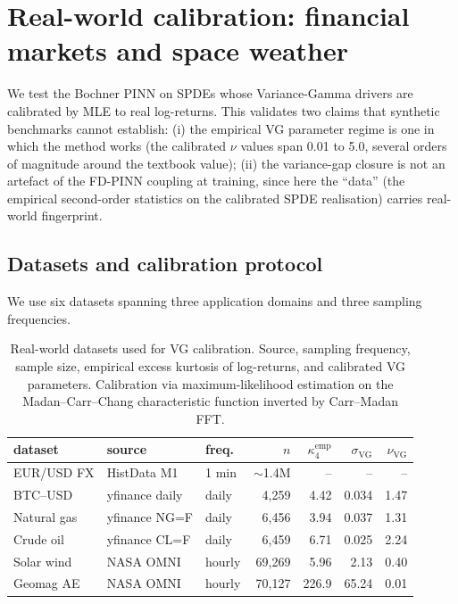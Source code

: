 \documentclass[review,12pt]{elsarticle}
\begin{document}
\section{Real-world calibration: financial markets and space weather}
\label{sec:real-world}

We test the Bochner PINN on SPDEs whose Variance-Gamma drivers are
calibrated by MLE to real log-returns. This validates two claims that
synthetic benchmarks cannot establish: (i) the empirical VG
parameter regime is one in which the method works (the calibrated
\(\nu\) values span 0.01 to 5.0, several orders of magnitude around
the textbook value); (ii) the variance-gap closure is not an artefact
of the FD-PINN coupling at training, since here the ``data'' (the
empirical second-order statistics on the calibrated SPDE realisation)
carries real-world fingerprint.

\subsection{Datasets and calibration protocol}
\label{subsec:datasets}

We use six datasets spanning three application domains and three
sampling frequencies.

\begin{table}[h]
\centering
\caption{Real-world datasets used for VG calibration. Source, sampling
frequency, sample size, empirical excess kurtosis of log-returns, and
calibrated VG parameters. Calibration via maximum-likelihood estimation
on the Madan--Carr--Chang
characteristic function inverted by Carr--Madan FFT.}
\label{tab:datasets}
\begin{tabular}{l l l r r r r}
\toprule
dataset & source & freq.\ & $n$ & $\kappa_4^{\mathrm{emp}}$
    & $\sigma_{\mathrm{VG}}$ & $\nu_{\mathrm{VG}}$ \\
\midrule
EUR/USD FX   & HistData M1   & 1 min & \(\sim\)1.4M & --  & --  & -- \\
BTC--USD    & yfinance daily & daily & 4{,}259   & 4.42 & 0.034 & 1.47 \\
Natural gas  & yfinance NG=F  & daily & 6{,}456   & 3.94 & 0.037 & 1.31 \\
Crude oil   & yfinance CL=F  & daily & 6{,}459   & 6.71 & 0.025 & 2.24 \\
Solar wind   & NASA OMNI    & hourly & 69{,}269  & 5.96 & 2.13 & 0.40 \\
Geomag AE   & NASA OMNI    & hourly & 70{,}127  & 226.9 & 65.24 & 0.01 \\
\bottomrule
\end{tabular}
\end{table}
\end{document}
